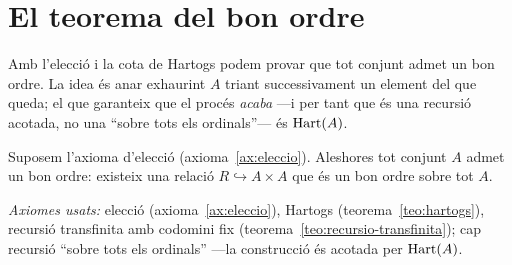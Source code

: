 \section{El teorema del bon ordre}\label{sec:teorema-bon-ordre}

Amb l'elecció i la cota de Hartogs podem provar que tot conjunt admet un bon
ordre. La idea és anar exhaurint \(A\) triant successivament un element del
que queda; el que garanteix que el procés \emph{acaba} ---i per tant que és
una recursió acotada, no una \enquote{sobre tots els ordinals}--- és
\(\operatorname{Hart}(A)\).

\begin{teorema}\label{teo:bon-ordre}
Suposem l'axioma d'elecció (axioma~\ref{ax:eleccio}). Aleshores tot conjunt
\(A\) admet un bon ordre: existeix una relació \(R\hookrightarrow A\times A\)
que és un bon ordre sobre tot \(A\).\par
\emph{Axiomes usats:} elecció (axioma~\ref{ax:eleccio}), Hartogs
(teorema~\ref{teo:hartogs}), recursió transfinita amb codomini fix
(teorema~\ref{teo:recursio-transfinita}); cap recursió \enquote{sobre tots els
ordinals} ---la construcció és acotada per \(\operatorname{Hart}(A)\).
\end{teorema}

